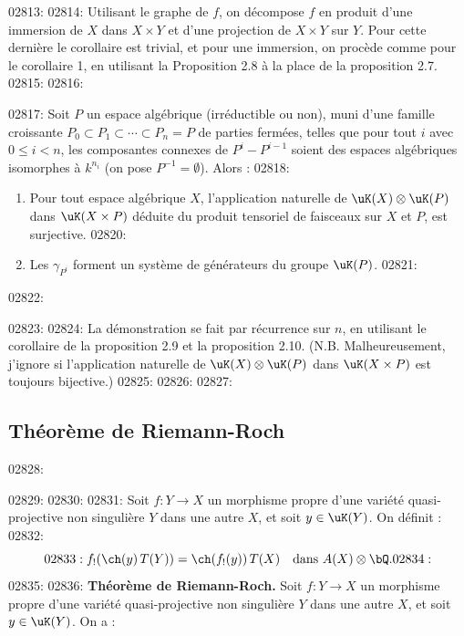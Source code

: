 02813: 
02814: Utilisant le graphe de $f$, on d\'ecompose $f$ en produit d'une immersion de $X$ dans $X \times Y$ et d'une projection de $X \times Y$ sur $Y$. Pour cette derni\`ere le corollaire est trivial, et pour une immersion, on proc\`ede comme pour le corollaire 1, en utilisant la Proposition 2.8 \`a la place de la proposition 2.7.
02815: 
02816: \begin{proposition}\label{prop:2.13}
02817: Soit $P$ un espace alg\'ebrique (irr\'eductible ou non), muni d'une famille croissante $P_0 \subset P_1 \subset \cdots \subset P_n = P$ de parties ferm\'ees, telles que pour tout $i$ avec $0 \leq i < n$, les composantes connexes de $P^i - P^{i-1}$ soient des espaces alg\'ebriques isomorphes \`a $k^{n_i}$ (on pose $P^{-1} = \emptyset$). Alors :
02818: \begin{enumerate}
02819: \item[a)] Pour tout espace alg\'ebrique $X$, l'application naturelle de $\uK(X) \otimes \uK(P)$ dans $\uK(X \times P)$ d\'eduite du produit tensoriel de faisceaux sur $X$ et $P$, est surjective.
02820: \item[b)] Les $\gamma_{P^i}$ forment un syst\`eme de g\'en\'erateurs du groupe $\uK(P)$.
02821: \end{enumerate}
02822: \end{proposition}
02823: 
02824: La d\'emonstration se fait par r\'ecurrence sur $n$, en utilisant le corollaire de la proposition 2.9 et la proposition 2.10. (N.B. Malheureusement, j'ignore si l'application naturelle de $\uK(X) \otimes \uK(P)$ dans $\uK(X \times P)$ est toujours bijective.)
02825: 
02826: %
02827: \subsection*{Th\'eor\`eme de Riemann-Roch}
02828: 
02829: %
02830: 
02831: Soit $f : Y \to X$ un morphisme propre d'une vari\'et\'e quasi-projective non singuli\`ere $Y$ dans une autre $X$, et soit $y \in \uK(Y)$. On d\'efinit :
02832: \begin{equation}\label{eq:rr}
02833: f_!(\ch(y)\,T(Y)) = \ch(f_!(y))\,T(X) \quad \text{dans } A(X) \otimes \bQ.
02834: \end{equation}
02835: 
02836: \textbf{Th\'eor\`eme de Riemann-Roch.} Soit $f : Y \to X$ un morphisme propre d'une vari\'et\'e quasi-projective non singuli\`ere $Y$ dans une autre $X$, et soit $y \in \uK(Y)$. On a :
